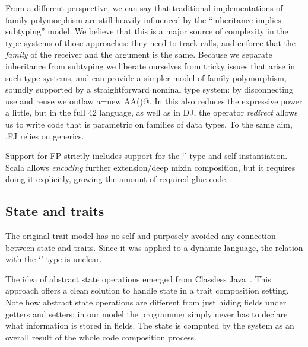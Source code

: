 From a different perspective, we can say that traditional
implementations of family polymorphism are still heavily influenced by
the ``inheritance implies subtyping'' model.
We believe that this is a major source of complexity in the type
systems of those approaches:
they need to track calls, and enforce that the \emph{family} of the receiver and the argument is the same.
Because we separate inheritance from subtyping we liberate ourselves
from tricky issues that arise in such type systems, and can
provide a simpler model of family polymorphism, soundly supported by 
a straightforward nominal type system:
by disconnecting use and reuse we outlaw \Q@A a=new AA()@.
In \name this also reduces the expressive power a little, but
in the full 42 language, as well as in DJ, the operator \emph{redirect} allows us to write code that is parametric on families of data types.
To the same aim, .FJ relies on generics.

Support for FP strictly includes
support for the `\Q@This@' type and self instantiation.
Scala allows \emph{encoding} further extension/deep mixin composition,
but it requires doing it explicitly, growing the amount of required glue-code.





\saveSpace
\subsection{State and traits}
\saveSpace
The original trait model has no self  
and purposely avoided any connection between state and traits.
Since it was applied to a dynamic language, the relation with the `\Q@This@' type is unclear.

The idea of abstract state operations emerged from Classless
Java~\cite{wang2016classless}. This approach offers a clean solution to handle state
in a trait composition setting.
Note how abstract state operations are different from just hiding fields under getters and setters: 
in our model the programmer simply never has to declare what information is stored in fields.
The state is computed by the system as an overall result of the whole code composition process.

